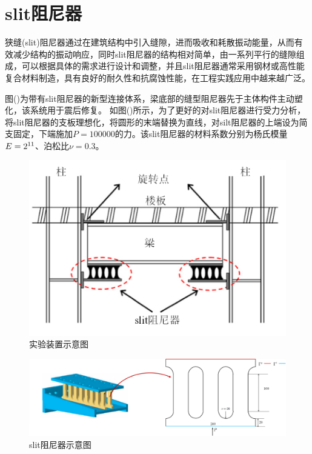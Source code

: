 \section{slit阻尼器}
狭缝(slit)阻尼器通过在建筑结构中引入缝隙，进而吸收和耗散振动能量，从而有效减少结构的振动响应，同时slit阻尼器的结构相对简单，由一系列平行的缝隙组成，可以根据具体的需求进行设计和调整，并且slit阻尼器通常采用钢材或高性能复合材料制造，具有良好的耐久性和抗腐蚀性能，在工程实践应用中越来越广泛。\par
图()为带有slit阻尼器的新型连接体系，梁底部的缝型阻尼器先于主体构件主动塑化，该系统用于震后修复。
如图()所示，为了更好的对slit阻尼器进行受力分析，将slit阻尼器的支板理想化，将圆形的末端替换为直线，对silt阻尼器的上端设为简支固定，下端施加$P=100000$的力。该slit阻尼器的材料系数分别为杨氏模量$E=2\time 10^{11}$、泊松比$\nu=0.3$。
\begin{figure}[H]
    \centering
    \includegraphics[scale=0.6]{figure/DAMPER/SLIT/1.png}
    \caption{实验装置示意图}
\end{figure}
\begin{figure}[H]
    \centering
    \includegraphics[scale=0.5]{figure/DAMPER/SLIT/2.png}
    \caption{slit阻尼器示意图}
\end{figure}
